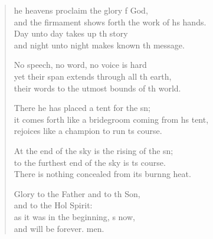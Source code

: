 \begin{verse}
  \begin{patverse}
he heavens proclaim the glory f God,\Med\\
and the firmament shows forth the work of h\pointup{\i}s hands.\\
Day unto day takes up th story\Med\\
and night unto night makes known th message.

No speech, no word, no voice is hard\Flex\\
yet their span extends through all th earth,\Med\\
their words to the utmost bounds of th world.

There he has placed a tent for the sn;\Flex\\
it comes forth like a bridegroom coming from hs tent,\Med\\
rejoices like a champion to run \pointup{\i}ts course.

At the end of the sky is the rising of the sn;\Flex\\
to the furthest end of the sky is ts course.\Med\\
There is nothing concealed from its burn\pointup{\i}ng heat.

Glory to the Father and to th Son,\Med\\
and to the Hol Spirit:\\
as it was in the beginning, s now,\Med\\
and will be forever. men. 
  \end{patverse}
\end{verse}
